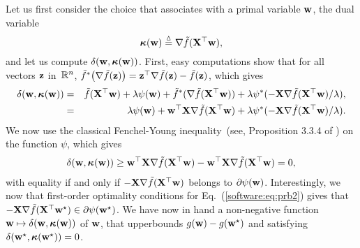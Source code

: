 \documentclass[a4paper, 11pt]{article}
\begin{document}
                Let us first consider the choice that associates with a primal variable ${\mathbf w}$, the
                dual variable
                \begin{equation}
                {\boldsymbol\kappa}({\mathbf w}) \stackrel{\vartriangle}{=} \nabla \tilde{f}({\mathbf X}^\top{\mathbf w}), \label{software:eq:kappab}
                \end{equation}
                and let us compute $\delta({\mathbf w},{\boldsymbol\kappa}({\mathbf w}))$.
                First, easy computations show that for all vectors ${\mathbf z}$ in~${\mathbb R}^n$,
                $\tilde{f}^\ast\big(\nabla\tilde{f}({\mathbf z})\big) = {\mathbf z}^\top\nabla\tilde{f}({\mathbf z})-\tilde{f}({\mathbf z})$,
                which gives
                \begin{eqnarray}
                \delta({\mathbf w},{\boldsymbol\kappa}({\mathbf w})) &=& \tilde{f}({\mathbf X}^\top {\mathbf w}) + \lambda \psi({\mathbf w}) + \tilde{f}^\ast(\nabla\tilde{f}({\mathbf X}^\top{\mathbf w})) + \lambda\psi^\ast(-{\mathbf X}\nabla\tilde{f}({\mathbf X}^\top{\mathbf w})/ \lambda), \\
                                         &=& \lambda \psi({\mathbf w}) + {\mathbf w}^\top{\mathbf X}\nabla\tilde{f}({\mathbf X}^\top{\mathbf w}) + \lambda\psi^\ast(-{\mathbf X}\nabla\tilde{f}({\mathbf X}^\top{\mathbf w})/ \lambda).
                                         \end{eqnarray}
                                         We now use the classical Fenchel-Young inequality~(see, Proposition
                                               3.3.4 of \cite{borwein}) on the function $\psi$, which gives
                                         \begin{displaymath}
                                         \begin{split}
                                         \delta({\mathbf w},{\boldsymbol\kappa}({\mathbf w}))  \geq  {\mathbf w}^\top{\mathbf X}\nabla\tilde{f}({\mathbf X}^\top{\mathbf w}) - {\mathbf w}^\top{\mathbf X}\nabla\tilde{f}({\mathbf X}^\top{\mathbf w}) = 0,
                                         \end{split}
                                         \end{displaymath}
                                         with equality if and only if $-{\mathbf X}\nabla\tilde{f}({\mathbf X}^\top{\mathbf w})$ belongs to
                                         $\partial \psi({\mathbf w})$.  Interestingly, we now that first-order optimality
                                         conditions for Eq.~(\ref{software:eq:prb2}) gives that
                                         $-{\mathbf X}\nabla\tilde{f}({\mathbf X}^\top{\mathbf w}^\star) \in \partial \psi({\mathbf w}^\star)$.
                                         We have now in hand a non-negative function ${\mathbf w} \mapsto \delta({\mathbf w},{\boldsymbol\kappa}({\mathbf w}))$ of ${\mathbf w}$, that
                                         upperbounds $g({\mathbf w})-g({\mathbf w}^\star)$ and satisfying $\delta({\mathbf w}^\star,{\boldsymbol\kappa}({\mathbf w}^\star))=0$.
\end{document}
